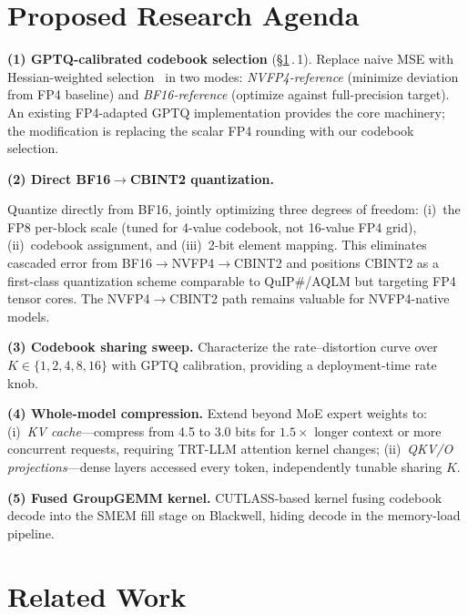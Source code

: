 \documentclass[11pt,a4paper]{article}
\begin{document}
\section{Proposed Research Agenda}
\label{sec:agenda}

\textbf{(1) GPTQ-calibrated codebook selection} (\S\ref{sec:agenda}\,.\,1).
\label{sec:agenda:gptq}
Replace naive MSE with Hessian-weighted selection~\cite{frantar2023gptq} in two modes: \emph{NVFP4-reference} (minimize deviation from FP4 baseline) and \emph{BF16-reference} (optimize against full-precision target).
An existing FP4-adapted GPTQ implementation provides the core machinery; the modification is replacing the scalar FP4 rounding with our codebook selection.

\textbf{(2) Direct BF16$\to$CBINT2 quantization.}
\label{sec:agenda:bf16}
\begin{sloppypar}
Quantize directly from BF16, jointly optimizing three degrees of freedom: (i)~the FP8 per-block scale (tuned for 4-value codebook, not 16-value FP4 grid), (ii)~codebook assignment, and (iii)~2-bit element mapping.
This eliminates cascaded error from BF16$\to$NVFP4$\to$CBINT2 and positions CBINT2 as a first-class quantization scheme comparable to QuIP\#/AQLM but targeting FP4 tensor cores.
The NVFP4$\to$CBINT2 path remains valuable for NVFP4-native models.
\end{sloppypar}

\textbf{(3) Codebook sharing sweep.}
\label{sec:agenda:sharing}
Characterize the rate--distortion curve over $K \in \{1,2,4,8,16\}$ with GPTQ calibration, providing a deployment-time rate knob.

\textbf{(4) Whole-model compression.}
\label{sec:agenda:wholmodel}
Extend beyond MoE expert weights to: (i)~\emph{KV cache}---compress from 4.5 to 3.0 bits for $1.5\times$ longer context or more concurrent requests, requiring TRT-LLM attention kernel changes; (ii)~\emph{QKV/O projections}---dense layers accessed every token, independently tunable sharing $K$.

\textbf{(5) Fused GroupGEMM kernel.}
\label{sec:agenda:kernel}
CUTLASS-based kernel fusing codebook decode into the SMEM fill stage on Blackwell, hiding decode in the memory-load pipeline.

\section{Related Work}
\end{document}
